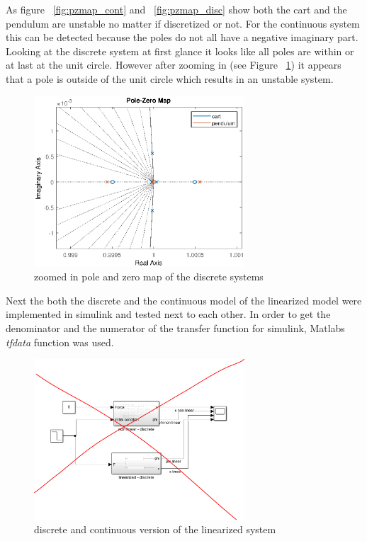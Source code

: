 As figure ~\ref{fig:pzmap_cont} and ~\ref{fig:pzmap_disc} show both the cart and the pendulum are unstable no matter if discretized or not. For the continuous system this can be detected because the poles do not all have a negative imaginary part. Looking at the discrete system at first glance it looks like all poles are within or at last at the unit circle. However after zooming in (see Figure ~\ref{fig:pzmap_disc_zoomed}) it appears that a pole is outside of the unit circle which results in an unstable system.
\begin{figure}[H]
		\centering
		\includegraphics[width=0.7\textwidth]{figures/pzmap_disc_zoomed.eps}
		\caption{zoomed in pole and zero map of the discrete systems}
		\label{fig:pzmap_disc_zoomed}
\end{figure}
Next the both the discrete and the continuous model of the linearized model were implemented in simulink and tested next to each other. In order to get the denominator and the numerator of the transfer function for simulink, Matlabs \textit{tfdata} function was used.
\begin{figure}[H]
		\centering
		\includegraphics[width=0.7\textwidth]{figures/both_linearized_subsystems.png}
		\caption{discrete and continuous version of the linearized system}
		\label{fig:both_linearized_subsystems}
\end{figure}


